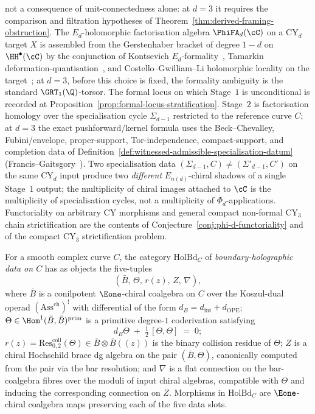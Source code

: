 \begin{theorem}
not a consequence of unit-connectedness alone: at $d=3$ it requires the
comparison and filtration hypotheses of
Theorem~\ref{thm:derived-framing-obstruction}. The
$E_d$-holomorphic factorisation algebra
$\PhiFA_d(\cC)$ on a CY$_d$ target $X$ is assembled from the
Gerstenhaber bracket of degree $1 - d$ on $\HH^\bullet(\cC)$ by the
conjunction of Kontsevich
$E_d$-formality~\cite{Kontsevich1999}, Tamarkin
deformation-quantisation~\cite{Tamarkin2007}, and
Costello--Gwilliam--Li holomorphic locality on the
target~\cite{CostelloGwilliam2017,CostelloLi2016,CostelloLi2020};
at $d = 3$, before this choice is fixed, the formality ambiguity is the
standard $\GRT_1(\Q)$-torsor. The formal locus on which Stage~$1$ is
unconditional is recorded at
Proposition~\ref{prop:formal-locus-stratification}.
Stage~$2$ is factorisation homology over the specialisation cycle
$\Sigma_{d - 1}$ restricted to the reference curve $C$; at $d=3$ the
exact pushforward/kernel formula uses the Beck--Chevalley,
Fubini/envelope, proper-support, Tor-independence, compact-support, and
completion data of
Definition~\ref{def:witnessed-admissible-specialisation-datum}
(Francis--Gaitsgory~\cite{FrancisGaitsgory2012}). Two specialisation
data $(\Sigma_{d-1}, C) \neq (\Sigma'_{d-1}, C')$ on the same CY$_d$
input produce two \emph{different} $E_{n(d)}$-chiral shadows of a
single Stage~$1$ output; the multiplicity of chiral images attached to
$\cC$ is the multiplicity of specialisation cycles, not a multiplicity
of $\Phi_d$-applications. Functoriality on arbitrary CY morphisms and
general compact non-formal CY$_3$ chain strictification are the
contents of Conjecture~\ref{conj:phi-d-functoriality} and of the
compact CY$_3$ strictification problem.
\end{theorem}

\begin{definition}
\label{def:holbd-target-category}
For a smooth complex curve $C$, the category $\mathrm{HolBd}_C$ of \emph{boundary-holographic data on $C$} has as objects the five-tuples
\[
 (\bar{B},\, \Theta,\, r(z),\, Z,\, \nabla),
\]
where $\bar B$ is a conilpotent $\Eone$-chiral coalgebra on $C$ over the Koszul-dual operad $(\mathrm{Ass}^{\mathrm{ch}})^!$ with differential of the form $d_B = d_{\mathrm{int}} + d_{\mathrm{OPE}}$; $\Theta \in \Hom^1(\bar B, \bar B)^{\mathrm{prim}}$ is a primitive degree-$1$ coderivation satisfying
\[
 d_B \Theta \;+\; \tfrac{1}{2}\,[\Theta, \Theta] \;=\; 0;
\]
$r(z) = \mathrm{Res}^{\mathrm{coll}}_{0, 2}(\Theta) \in \bar B \otimes \bar B((z))$ is the binary collision residue of $\Theta$; $Z$ is a chiral Hochschild brace dg algebra on the pair $(\bar B, \Theta)$, canonically computed from the pair via the bar resolution; and $\nabla$ is a flat connection on the bar-coalgebra fibres over the moduli of input chiral algebras, compatible with $\Theta$ and inducing the corresponding connection on $Z$. Morphisms in $\mathrm{HolBd}_C$ are $\Eone$-chiral coalgebra maps preserving each of the five data slots.
\end{definition}

